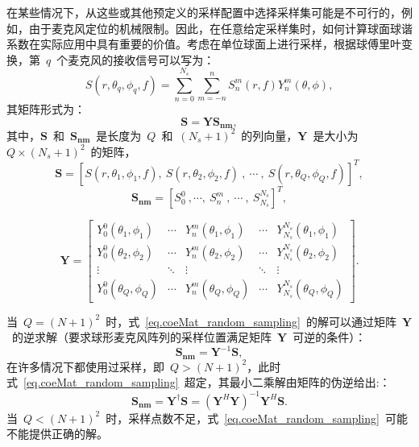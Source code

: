 在某些情况下，从这些或其他预定义的采样配置中选择采样集可能是不可行的，例如，由于麦克风定位的机械限制。因此，在任意给定采样集时，如何计算球面球谐系数在实际应用中具有重要的价值。考虑在单位球面上进行采样，根据球傅里叶变换，第~$q$~个麦克风的接收信号可以写为：
\begin{equation}\label{eq.coe_random_sampling}
   S(r,\theta_{q},\phi_{q},f)=\sum _{n=0}^{N_{s}}\sum _{m=-n}^n S_n ^m(r,f)Y_n ^m(\theta,\phi),
\end{equation}
其矩阵形式为：
\begin{equation}\label{eq.coeMat_random_sampling}
\bm{S}=\bm{Y S_{nm}},
\end{equation}
其中，$\bm{S}$~和~$\bm{S_{nm}}$~是长度为~$Q$~和~$(N_{s}+1)^2$~的列向量，$\bm{Y}$~是大小为~$Q\times(N_{s}+1)^2$~的矩阵，
\begin{equation}
\bm{S} = [S(r,\theta_{1},\phi_{1},f),~S(r,\theta_{2},\phi_{2},f)~,~\cdots~,~S(r,\theta_{Q},\phi_{Q},f)]^{T},
\end{equation}
\begin{equation}
\bm{S_{nm}} = [S_{0}^{0}~,\cdots,~S_{n}^{m}~,~\cdots~,~S_{N_{s}}^{N_{s}}]^{T},
\end{equation}

\begin{equation}
\bm{Y}=\left[
\begin{array}{ccccc}
Y_{0}^{0}\left(\theta_{1}, \phi_{1}\right) & \cdots & Y_{n}^{m}\left(\theta_{1}, \phi_{1}\right) & \cdots & Y_{N_{s}}^{N_{s}}\left(\theta_{1}, \phi_{1}\right) \\
Y_{0}^{0}\left(\theta_{2}, \phi_{2}\right) & \cdots &  Y_{n}^{m}\left(\theta_{2}, \phi_{2}\right) & \cdots & Y_{N_{s}}^{N_{s}}\left(\theta_{2}, \phi_{2}\right) \\
\vdots  & \ddots & \vdots  & \ddots & \vdots \\
Y_{0}^{0}\left(\theta_{Q}, \phi_{Q}\right) & \cdots & Y_{n}^{m}\left(\theta_{Q}, \phi_{Q}\right) & \cdots & Y_{N_{s}}^{N_{s}}\left(\theta_{Q}, \phi_{Q}\right)
\end{array}\right].
\end{equation}

当~$Q=(N+1)^2$~时，式~\eqref{eq.coeMat_random_sampling}~的解可以通过矩阵~$\bm{Y}$~的逆求解（要求球形麦克风阵列的采样位置满足矩阵~$\bm{Y}$~可逆的条件）：
\begin{equation}
\bm{S_{nm}} = \bm{Y}^{-1}\bm{S},
\end{equation}
在许多情况下都使用过采样，即~$Q>(N+1)^2$，此时式~\eqref{eq.coeMat_random_sampling}~超定，其最小二乘解由矩阵的伪逆给出:：
\begin{equation}
\bm{S_{nm}} = \bm{Y^{\dagger}} \bm{S}= (\bm{Y}^{H}\bm{Y})^{-1}\bm{Y}^{H}\bm{S}.
\end{equation}
当~$Q<(N+1)^2$~时，采样点数不足，式~\eqref{eq.coeMat_random_sampling}~可能不能提供正确的解。

